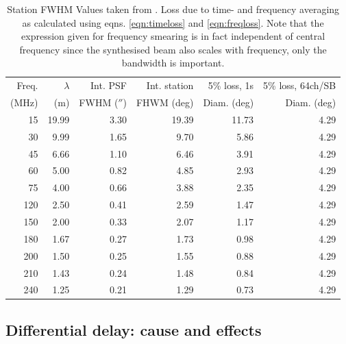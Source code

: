 \documentclass[graybox]{svmult}
\begin{document}
\begin{table}[h]
\centering
\begin{tabular}{rrrrrr}
\hline\hline
Freq. & $\lambda$ & Int. PSF & Int. station& 5\% loss, 1s& 5\% loss, 64ch/SB\\
(MHz) & (m) & FWHM ($''$) & FHWM (deg) & Diam. (deg) & Diam. (deg)\\
\hline
15 & 19.99 & 3.30 & 19.39 & 11.73 & 4.29\\
30 & 9.99 & 1.65 & 9.70 & 5.86 & 4.29\\
45 & 6.66 & 1.10 & 6.46 & 3.91 & 4.29\\
60 & 5.00 & 0.82 & 4.85 & 2.93 & 4.29\\
75 & 4.00 & 0.66 & 3.88 & 2.35 & 4.29\\
120 & 2.50 & 0.41 & 2.59 & 1.47 & 4.29\\
150 & 2.00 & 0.33 & 2.07 & 1.17 & 4.29\\
180 & 1.67 & 0.27 & 1.73 & 0.98 & 4.29\\
200 & 1.50 & 0.25 & 1.55 & 0.88 & 4.29\\
210 & 1.43 & 0.24 & 1.48 & 0.84 & 4.29\\
240 & 1.25 & 0.21 & 1.29 & 0.73 & 4.29\\
\hline
\end{tabular}
\caption{Station FWHM Values taken from \cite[App. B]{vanhaarlem13}. Loss due
to time- and frequency averaging as calculated using eqns.
\ref{eqn:timeloss} and \ref{eqn:freqloss}. Note that the expression
given for frequency smearing is in fact independent of central frequency since
the synthesised beam also scales with frequency, only the
bandwidth is important.
\label{tab:res}}
\end{table}


\subsection{Differential delay: cause and effects}
\end{document}
